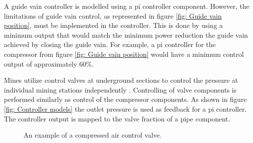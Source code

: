		\par
		A guide vain controller is modelled using a \gls{pi} controller component. However, the limitations of guide vain control, as represented in figure \ref{fig: Guide vain position}, must be implemented in the controller. This is done by using a minimum output that would match the minimum power reduction the guide vain achieved by closing the guide vain. For example, a \gls{pi} controller for the compressor from figure \ref{fig: Guide vain position} would have a minimum control output of approximately 60\%.
		\par 
		Mines utilize control valves at underground sections to control the pressure at individual mining stations independently \cite{Heyns2014Masters}. Controlling of valve components is performed similarly as control of the compressor components. As shown in figure \ref{fig: Controller models} the outlet pressure is used as feedback for a pi controller. The controller output is mapped to the valve fraction of a pipe component.
		\begin{figure}[h]
			\centering
			\caption[An example of a compressed air control valve.]{An example of a compressed air control valve\cite{van2015implementation}.} 
			\label{fig: Control}
		\end{figure}
